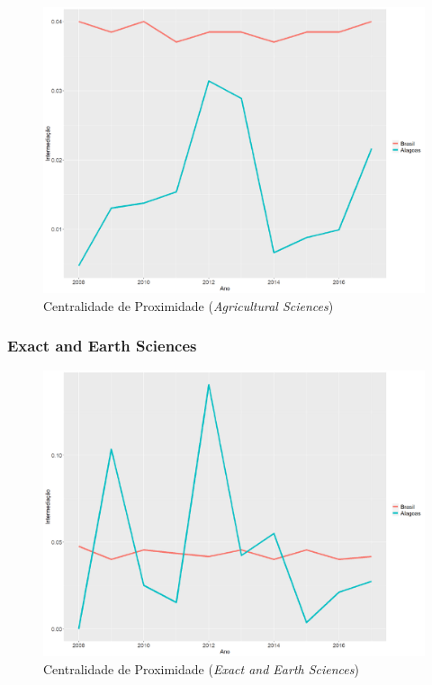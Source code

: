 \begin{figure}[H]
	\centering
	\includegraphics[scale=0.4]{Imagens/agricultural/graf-linha-betweeness-br-al.pdf}
	\caption{Centralidade de Proximidade (\textit{Agricultural Sciences})}
	\label{between-agri-1}
\end{figure}

\subsubsection{Exact and Earth Sciences}

\begin{figure}[H]
	\centering
	\includegraphics[scale=0.4]{Imagens/exact/graf-linha-betweeness-br-al.pdf}
	\caption{Centralidade de Proximidade (\textit{Exact and Earth Sciences})}
	\label{between-exact-1}
\end{figure}

